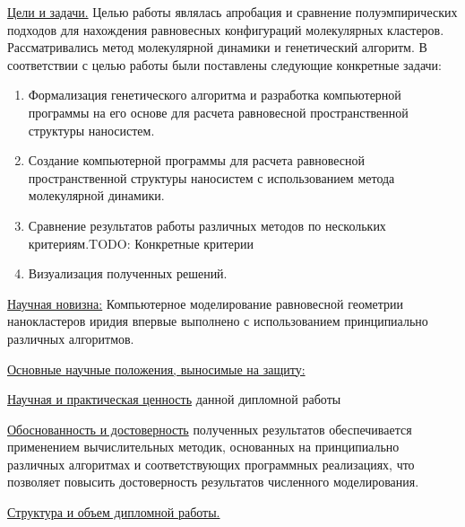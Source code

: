 \vspace{+0.3cm}
\underline{\noindent Цели и задачи.} Целью работы являлась апробация и сравнение полуэмпирических подходов для нахождения
равновесных конфигураций молекулярных кластеров. Рассматривались метод молекулярной динамики и
генетический алгоритм. В соответствии с целью работы были поставлены следующие конкретные задачи:
\begin{enumerate}
  \item {\vspace{-0.0cm} Формализация генетического алгоритма и разработка компьютерной программы
      на его основе для расчета равновесной пространственной структуры наносистем.} 
  \item {\vspace{-0.0cm} Создание компьютерной программы для расчета равновесной пространственной структуры наносистем
         с использованием метода молекулярной динамики.} 
  \item {\vspace{-0.0cm} Сравнение результатов работы различных методов по нескольких критериям.TODO: Конкретные критерии}
  \item {\vspace{-0.0cm} Визуализация полученных решений.}
\end{enumerate}

\vspace{+0.0cm}
\underline{Научная новизна:} Компьютерное моделирование равновесной геометрии нанокластеров иридия впервые
выполнено с использованием принципиально различных алгоритмов.


\vspace{+0.0cm} \underline{Основные научные положения, выносимые на защиту:}

\underline{Научная и практическая ценность} данной дипломной работы

\underline{Обоснованность и достоверность} полученных результатов
обеспечивается применением вычислительных методик, основанных на принципиально
различных алгоритмах и соответствующих программных реализациях, что позволяет
повысить достоверность результатов численного моделирования.

\underline{Структура и объем дипломной работы.}
